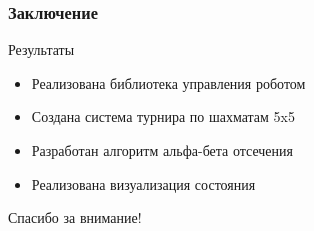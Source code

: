\documentclass[14pt]{beamer}
\begin{document}
\begin{frame}
\frametitle{Заключение}
\begin{block}{Результаты}
\begin{itemize}
\item Реализована библиотека управления роботом
\item Создана система турнира по шахматам 5x5
\item Разработан алгоритм альфа-бета отсечения
\item Реализована визуализация состояния
\end{itemize}
\end{block}
\end{frame}

\begin{frame}
\begin{center}
\Huge Спасибо за внимание!
\end{center}
\end{frame}
\end{document}
